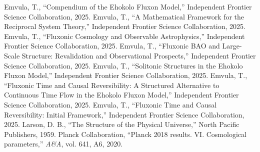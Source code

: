 \documentclass[11pt]{article}
\begin{document}
\begin{thebibliography}{9}
\raggedright
{} Emvula, T., ``Compendium of the Ehokolo Fluxon Model,'' Independent Frontier Science Collaboration, 2025.
 Emvula, T., ``A Mathematical Framework for the Reciprocal System Theory,'' Independent Frontier Science Collaboration, 2025.
 Emvula, T., ``Fluxonic Cosmology and Observable Astrophysics,'' Independent Frontier Science Collaboration, 2025.
 Emvula, T., ``Fluxonic BAO and Large-Scale Structure: Revalidation and Observational Prospects,'' Independent Frontier Science Collaboration, 2025.
 Emvula, T., ``Solitonic Structures in the Ehokolo Fluxon Model,'' Independent Frontier Science Collaboration, 2025.
 Emvula, T., ``Fluxonic Time and Causal Reversibility: A Structured Alternative to Continuous Time Flow in the Ehokolo Fluxon Model,'' Independent Frontier Science Collaboration, 2025.
 Emvula, T., ``Fluxonic Time and Causal Reversibility: Initial Framework,'' Independent Frontier Science Collaboration, 2025.
 Larson, D. B., ``The Structure of the Physical Universe,'' North Pacific Publishers, 1959.
 Planck Collaboration, ``Planck 2018 results. VI. Cosmological parameters,'' \textit{A\&A}, vol. 641, A6, 2020.
\end{thebibliography}
\end{document}
